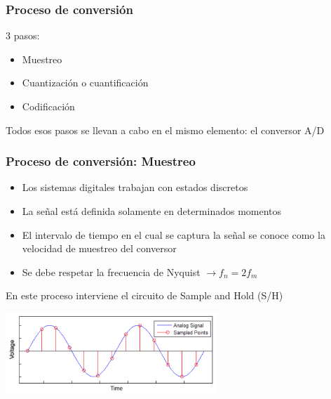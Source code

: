 \documentclass{beamer}
\begin{document}
\begin{frame}
	\frametitle{Proceso de conversión}
		\begin{block}{3 pasos:}
    	\begin{itemize}
      	\item Muestreo
      	\item Cuantización o cuantificación
      	\item Codificación
    	\end{itemize}
		\end{block}
{
		\begin{block}{}
Todos esos pasos se llevan a cabo en el mismo elemento: \alert{el conversor A/D}
		\end{block}
}
\begin{center}
\end{center}
\end{frame} 

\begin{frame}
	\frametitle{Proceso de conversión: Muestreo}
		\begin{block}{}
    	\begin{itemize}
      	\item Los sistemas digitales trabajan con estados discretos
      	\item La señal está definida solamente en determinados momentos
        \item El intervalo de tiempo en el cual se captura la señal se conoce
como la velocidad de muestreo del conversor
      	\item Se debe respetar la frecuencia de Nyquist $\rightarrow f_n = 2f_m$
    	\end{itemize}
		\end{block}
{
		\begin{block}{}
En este proceso interviene el circuito de
{\color[rgb]{0.82, 0.1, 0.26} Sample and Hold (S/H)}
		\end{block}
}
\begin{center}
    \includegraphics[width=0.6\textwidth]{d3/sampling}
\end{center}
\end{frame} 
\end{document}
